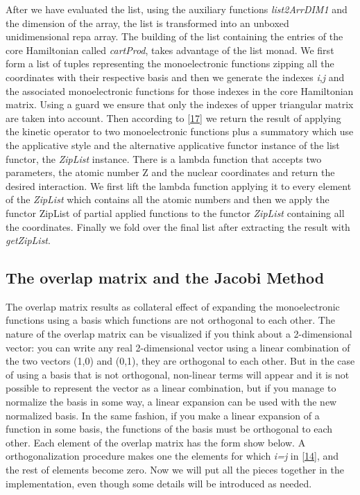 \documentclass{tmr}
\begin{document}
After we have evaluated the list, using the auxiliary functions \textit{list2ArrDIM1}
and the dimension of the array, the list is transformed into an unboxed unidimensional repa array.
The building of the list containing the entries of the core Hamiltonian called \textit{cartProd},
takes advantage of the list monad. We first form a list of tuples representing the monoelectronic
functions zipping all the coordinates with their respective basis and then we generate the
indexes \textit{i},\textit{j} and the associated monoelectronic functions for those 
indexes in the core Hamiltonian matrix. Using a guard we ensure that only the indexes of
upper triangular matrix are taken into account. Then according to \eqref{17} we return
the result of applying the kinetic operator to two monoelectronic functions plus a summatory
which use the applicative style and the alternative applicative functor instance of the list functor, the
\textit{ZipList} instance. There is a lambda function that accepts two parameters, the atomic number Z and
the nuclear coordinates and return the desired interaction.  We first lift the lambda function applying it
to every element of the \textit{ZipList} which contains all the atomic numbers and then we apply the 
functor ZipList of partial applied functions to the functor \textit{ZipList} 
containing all the coordinates. Finally we fold over the final list after extracting
the result with \textit{getZipList}.

\subsection{The overlap matrix and the Jacobi Method}

The overlap  matrix results as collateral effect of expanding the monoelectronic 
functions using a basis which functions are not orthogonal to each other. The nature 
of the overlap matrix can be visualized if you think about a 2-dimensional vector:
you can write any real 2-dimensional vector using a linear combination of the two
vectors (1,0) and (0,1), they are orthogonal to each other. But in the case 
of using a basis that is not orthogonal, non-linear terms will appear and 
it is not possible to represent the vector as a linear combination, 
but if you manage to normalize the basis in some way, a linear expansion can
be used with the new normalized basis. In the same fashion, if you make a linear expansion 
of a function in some basis, the functions of the basis must be orthogonal
to each other. Each element of the overlap matrix has the form show below.
A orthogonalization procedure makes one the elements for which \textit{i=j} in \eqref{14}, and
the rest of elements become zero. Now we will put all the pieces together in the implementation, 
even though some details will be introduced as needed.
\end{document}
